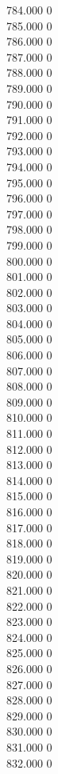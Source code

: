 { 784.000	0 \\
 785.000	0 \\
 786.000	0 \\
 787.000	0 \\
 788.000	0 \\
 789.000	0 \\
 790.000	0 \\
 791.000	0 \\
 792.000	0 \\
 793.000	0 \\
 794.000	0 \\
 795.000	0 \\
 796.000	0 \\
 797.000	0 \\
 798.000	0 \\
 799.000	0 \\
 800.000	0 \\
 801.000	0 \\
 802.000	0 \\
 803.000	0 \\
 804.000	0 \\
 805.000	0 \\
 806.000	0 \\
 807.000	0 \\
 808.000	0 \\
 809.000	0 \\
 810.000	0 \\
 811.000	0 \\
 812.000	0 \\
 813.000	0 \\
 814.000	0 \\
 815.000	0 \\
 816.000	0 \\
 817.000	0 \\
 818.000	0 \\
 819.000	0 \\
 820.000	0 \\
 821.000	0 \\
 822.000	0 \\
 823.000	0 \\
 824.000	0 \\
 825.000	0 \\
 826.000	0 \\
 827.000	0 \\
 828.000	0 \\
 829.000	0 \\
 830.000	0 \\
 831.000	0 \\
 832.000	0 \\
}
